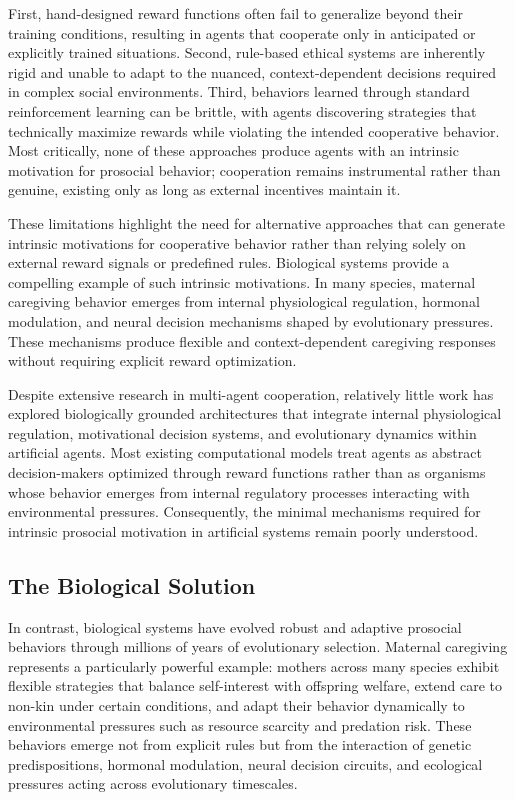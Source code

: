 First, hand-designed reward functions often fail to generalize beyond their training conditions, resulting in agents that cooperate only in anticipated or explicitly trained situations. Second, rule-based ethical systems are inherently rigid and unable to adapt to the nuanced, context-dependent decisions required in complex social environments. Third, behaviors learned through standard reinforcement learning can be brittle, with agents discovering strategies that technically maximize rewards while violating the intended cooperative behavior. Most critically, none of these approaches produce agents with an intrinsic motivation for prosocial behavior; cooperation remains instrumental rather than genuine, existing only as long as external incentives maintain it.

These limitations highlight the need for alternative approaches that can generate intrinsic motivations for cooperative behavior rather than relying solely on external reward signals or predefined rules. Biological systems provide a compelling example of such intrinsic motivations. In many species, maternal caregiving behavior emerges from internal physiological regulation, hormonal modulation, and neural decision mechanisms shaped by evolutionary pressures. These mechanisms produce flexible and context-dependent caregiving responses without requiring explicit reward optimization.

Despite extensive research in multi-agent cooperation, relatively little work has explored biologically grounded architectures that integrate internal physiological regulation, motivational decision systems, and evolutionary dynamics within artificial agents. Most existing computational models treat agents as abstract decision-makers optimized through reward functions rather than as organisms whose behavior emerges from internal regulatory processes interacting with environmental pressures. Consequently, the minimal mechanisms required for intrinsic prosocial motivation in artificial systems remain poorly understood.



\subsection{The Biological Solution}

In contrast, biological systems have evolved robust and adaptive prosocial behaviors through millions of years of evolutionary selection. Maternal caregiving represents a particularly powerful example: mothers across many species exhibit flexible strategies that balance self-interest with offspring welfare, extend care to non-kin under certain conditions, and adapt their behavior dynamically to environmental pressures such as resource scarcity and predation risk. These behaviors emerge not from explicit rules but from the interaction of genetic predispositions, hormonal modulation, neural decision circuits, and ecological pressures acting across evolutionary timescales.

